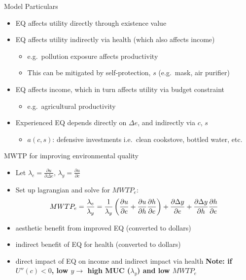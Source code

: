 \documentclass[
  ignorenonframetext,
  aspectratio=169]{beamer}
\providecommand{\tightlist}{%
  \setlength{\itemsep}{0pt}\setlength{\parskip}{0pt}}
\begin{document}
\begin{frame}{Model Particulars}
\protect\hypertarget{model-particulars}{}
\begin{itemize}
\tightlist
\item
  EQ affects utility directly through existence value \vfill
\item
  EQ affects utility indirectly via health (which also affects income)

  \begin{itemize}
  \tightlist
  \item
    e.g.~pollution exposure affects productivity
  \item
    This can be mitigated by self-protection, \(s\) (e.g.~mask, air
    purifier) \vfill
  \end{itemize}
\item
  EQ affects income, which in turn affects utility via budget constraint

  \begin{itemize}
  \tightlist
  \item
    e.g.~agricultural productivity \vfill
  \end{itemize}
\item
  Experienced EQ depends directly on \(\Delta e\), and indirectly via
  \(c\), \(s\)

  \begin{itemize}
  \tightlist
  \item
    \(a(c,s)\): defensive investments i.e.~clean cookstove, bottled
    water, etc.
  \end{itemize}
\end{itemize}
\end{frame}

\begin{frame}{MWTP for improving environmental quality}
\protect\hypertarget{mwtp-for-improving-environmental-quality}{}
\begin{itemize}
\item
  Let \(\lambda_{e} = \frac{\partial u}{\partial \Delta e}\),
  \(\lambda_{y} = \frac{\partial u}{\partial c}\)
\item
  Set up lagrangian and solve for \(MWTP_{e}\): \begin{align}
  MWTP_{e} = \frac{\lambda_{e}}{\lambda_{y}} 
   = \frac{1}{\lambda_{y}} \left(\frac{\partial u}{\partial e} + \frac{\partial u}{\partial h}\frac{\partial h}{\partial e}\right) + \frac{\partial \Delta y}{\partial e} + \frac{\partial \Delta y}{\partial h}\frac{\partial h}{\partial e} \notag
  \end{align}
\item
  aesthetic benefit from improved EQ (converted to dollars)
\item
  indirect benefit of EQ for health (converted to dollars)
\item
  direct impact of EQ on income and indirect impact via health \vfill
  \textbf{Note: if \(U''(c)<0\), low \(y \rightarrow\) high MUC
  (\(\lambda_{y}\)) and low \(MWTP_{e}\)}
\end{itemize}
\end{frame}
\end{document}
